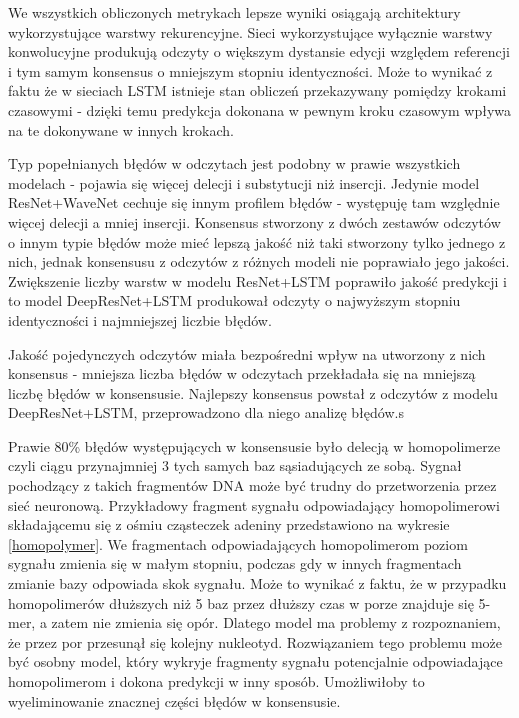 \documentclass[a4paper,11pt,twoside]{report}
\theoremstyle{definition}
\begin{document}
We wszystkich obliczonych metrykach lepsze wyniki osiągają architektury wykorzystujące warstwy rekurencyjne. Sieci wykorzystujące wyłącznie warstwy konwolucyjne produkują odczyty o większym dystansie edycji względem referencji i tym samym konsensus o mniejszym stopniu identyczności. Może to wynikać z faktu że w sieciach LSTM istnieje stan obliczeń przekazywany pomiędzy krokami czasowymi - dzięki temu predykcja dokonana w pewnym kroku czasowym wpływa na te dokonywane w innych krokach. 

Typ popełnianych błędów w odczytach jest podobny w prawie wszystkich modelach - pojawia się więcej delecji i substytucji niż insercji. Jedynie model ResNet+WaveNet cechuje się innym profilem błędów - występuję tam względnie więcej delecji a mniej insercji. Konsensus stworzony z dwóch zestawów odczytów o innym typie błędów może mieć lepszą jakość niż taki stworzony tylko jednego z nich, jednak  konsensusu z odczytów z różnych modeli nie poprawiało jego jakości. Zwiększenie liczby warstw w modelu ResNet+LSTM poprawiło jakość predykcji i to model DeepResNet+LSTM produkował odczyty o najwyższym stopniu identyczności i najmniejszej liczbie błędów. 

Jakość pojedynczych odczytów miała bezpośredni wpływ na utworzony z nich konsensus - mniejsza liczba błędów w odczytach przekładała się na mniejszą liczbę błędów w konsensusie. Najlepszy konsensus powstał z odczytów z modelu DeepResNet+LSTM, przeprowadzono dla niego analizę błędów.s

Prawie 80\% błędów występujących w konsensusie było delecją w homopolimerze czyli ciągu przynajmniej 3 tych samych baz sąsiadujących ze sobą. Sygnał pochodzący z takich fragmentów DNA może być trudny do przetworzenia przez sieć neuronową. Przykładowy fragment sygnału odpowiadający homopolimerowi składającemu się z ośmiu cząsteczek adeniny przedstawiono na wykresie \ref{homopolymer}. We fragmentach odpowiadających homopolimerom poziom sygnału zmienia się w małym stopniu, podczas gdy w innych fragmentach zmianie bazy odpowiada skok sygnału. Może to wynikać z faktu, że w przypadku homopolimerów dłuższych niż 5 baz przez dłuższy czas w porze znajduje się 5-mer, a zatem nie zmienia się opór. Dlatego model ma problemy z rozpoznaniem, że przez por przesunął się kolejny nukleotyd. Rozwiązaniem tego problemu może być osobny model, który wykryje fragmenty sygnału potencjalnie odpowiadające homopolimerom i dokona predykcji w inny sposób. Umożliwiłoby to wyeliminowanie znacznej części błędów w konsensusie.
\end{document}
